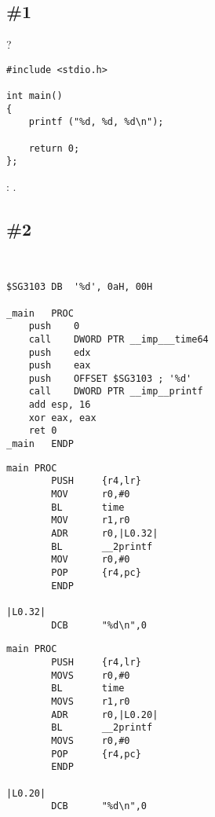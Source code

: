 \section{\Exercises}

\subsection{\Exercise \#1}
\label{exercise_stack_1}

?

\begin{lstlisting}
#include <stdio.h>

int main()
{
	printf ("%d, %d, %d\n");

	return 0;
};
\end{lstlisting}

\Answer{}: .

\subsection{\Exercise \#2}
\label{exercise_stack_2}

\WhatThisCodeDoes\

\begin{lstlisting}[caption=\Optimizing MSVC 2010]
$SG3103	DB	'%d', 0aH, 00H

_main	PROC
	push	0
	call	DWORD PTR __imp___time64
	push	edx
	push	eax
	push	OFFSET $SG3103 ; '%d'
	call	DWORD PTR __imp__printf
	add	esp, 16
	xor	eax, eax
	ret	0
_main	ENDP
\end{lstlisting}

\begin{lstlisting}[caption=\OptimizingKeilVI (\ARMMode)]
main PROC
        PUSH     {r4,lr}
        MOV      r0,#0
        BL       time
        MOV      r1,r0
        ADR      r0,|L0.32|
        BL       __2printf
        MOV      r0,#0
        POP      {r4,pc}
        ENDP

|L0.32|
        DCB      "%d\n",0
\end{lstlisting}

\begin{lstlisting}[caption=\OptimizingKeilVI (\ThumbMode)]
main PROC
        PUSH     {r4,lr}
        MOVS     r0,#0
        BL       time
        MOVS     r1,r0
        ADR      r0,|L0.20|
        BL       __2printf
        MOVS     r0,#0
        POP      {r4,pc}
        ENDP

|L0.20|
        DCB      "%d\n",0
\end{lstlisting}

